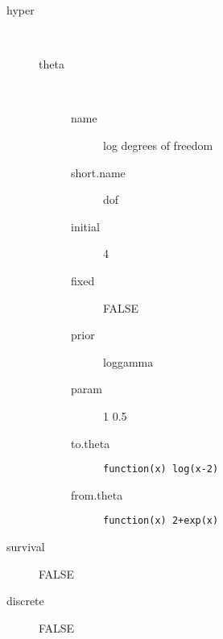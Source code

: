 \begin{description}
	\item[hyper]\ 
	 \begin{description}
	 	\item[theta]\ 
	 	 \begin{description}
	 	 	 \item[ name ] log degrees of freedom 
	 	 	 \item[ short.name ] dof 
	 	 	 \item[ initial ] 4 
	 	 	 \item[ fixed ] FALSE 
	 	 	 \item[ prior ] loggamma 
	 	 	 \item[ param ] 1 0.5 
	 	 	 \item[ to.theta ] \verb|function(x) log(x-2)| 
	 	 	 \item[ from.theta ] \verb|function(x) 2+exp(x)| 
	 	 \end{description}
	 \end{description}
	 \item[ survival ] FALSE 
	 \item[ discrete ] FALSE 
\end{description}
